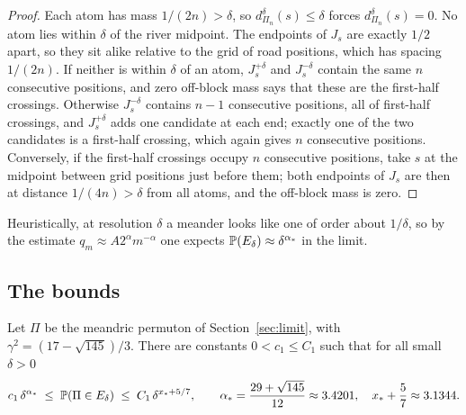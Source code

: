 \begin{proof}
Each atom has mass $1/(2n)>\delta$, so $d^\delta_{\Pi_n}(s)\le\delta$ forces $d^\delta_{\Pi_n}(s)=0$. No
atom lies within $\delta$ of the river midpoint. The endpoints of $J_s$ are exactly $1/2$ apart, so
they sit alike relative to the grid of road positions, which has spacing $1/(2n)$. If neither is within $\delta$ of an
atom, $J_s^{+\delta}$ and $J_s^{-\delta}$ contain the same $n$ consecutive positions, and zero
off-block mass says that these are the first-half crossings. Otherwise $J_s^{-\delta}$ contains $n-1$
consecutive positions, all of first-half crossings, and $J_s^{+\delta}$ adds one candidate at each end;
exactly one of the two candidates is a first-half crossing, which again gives $n$ consecutive
positions. Conversely, if the first-half crossings occupy $n$ consecutive positions, take $s$ at the
midpoint between grid positions just before them; both endpoints of $J_s$ are then at distance
$1/(4n)>\delta$ from all atoms, and the off-block mass is zero.
\end{proof}

Heuristically, at resolution $\delta$ a meander looks like one of order about $1/\delta$, so by the
estimate $q_m\approx A2^\alpha m^{-\alpha}$ one expects $\mathbb{P}(E_\delta)\approx\delta^{\alpha_*}$ in the
limit.

\subsection{The bounds}

\begin{theorem}\label{thm:nearsplit}
Let $\Pi$ be the meandric permuton of Section~\ref{sec:limit}, with
$\gamma^2=(17-\sqrt{145})/3$. There are constants $0<c_1\le C_1$ such that for all small $\delta>0$
\[
c_1\,\delta^{\alpha_*}\;\le\;\mathbb{P}(\Pi\in E_\delta)\;\le\;C_1\,\delta^{x_*+5/7},
\qquad\alpha_*=\frac{29+\sqrt{145}}{12}\approx3.4201,\quad x_*+\frac57\approx3.1344 .
\]
\end{theorem}

